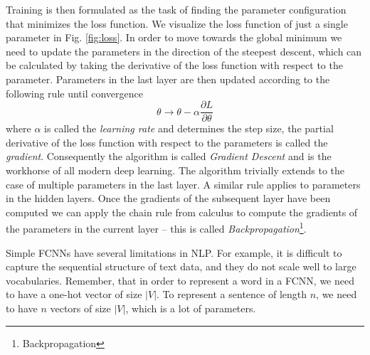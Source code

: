 Training is then formulated as the task of finding the parameter configuration that minimizes the loss function.
We visualize the loss function of just a single parameter in Fig. \ref{fig:loss}.
In order to move towards the global minimum we need to update the parameters in the direction of the steepest descent, which can be calculated by taking the derivative of the loss function with respect to the parameter.
Parameters in the last layer are then updated according to the following rule until convergence
\begin{equation}
    \label{eq:optimization}
    \theta \rightarrow \theta - \alpha \frac{\partial L}{\partial \theta}
\end{equation}
where $\alpha$ is called the \textit{learning rate} and determines the step size, the partial derivative of the loss function with respect to the parameters is called the \textit{gradient}.
Consequently the algorithm is called \textit{Gradient Descent} and is the workhorse of all modern deep learning.
The algorithm trivially extends to the case of multiple parameters in the last layer.
A similar rule applies to parameters in the hidden layers.
Once the gradients of the subsequent layer have been computed we can apply the chain rule from calculus to compute the gradients of the parameters in the current layer -- this is called \textit{Backpropagation}\footnote{Backpropagation}.

Simple FCNNs have several limitations in NLP.
For example, it is difficult to capture the sequential structure of text data, and they do not scale well to large vocabularies.
Remember, that in order to represent a word in a FCNN, we need to have a one-hot vector of size $|V|$.
To represent a sentence of length $n$, we need to have $n$ vectors of size $|V|$, which is a lot of parameters.

